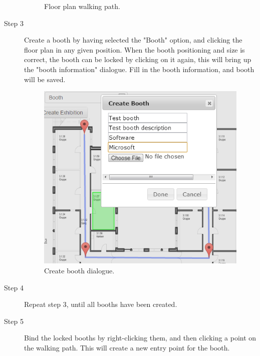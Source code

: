 \begin{description}
\begin{figure}[H]
		\caption{Floor plan walking path.\label{fig:websitestep2}}
	\end{figure}
	\item[Step 3] Create a booth by having selected the "Booth" option, and clicking the floor plan in any given position. When the booth positioning and size is correct, the booth can be locked by clicking on it again, this will bring up the "booth information" dialogue. Fill in the booth information, and booth will be saved.
	\begin{figure}[H]
		\centering
		\includegraphics[width=\linewidth]{img/website/step4.png}
		\caption{Create booth dialogue.\label{fig:websitestep3}}
	\end{figure}
	\item[Step 4] Repeat step 3, until all booths have been created.
	\item[Step 5] Bind the locked booths by right-clicking them, and then clicking a point on the walking path. This will create a new entry point for the booth.
	\begin{figure}[H]
		\centering

\end{figure}
\end{description}

